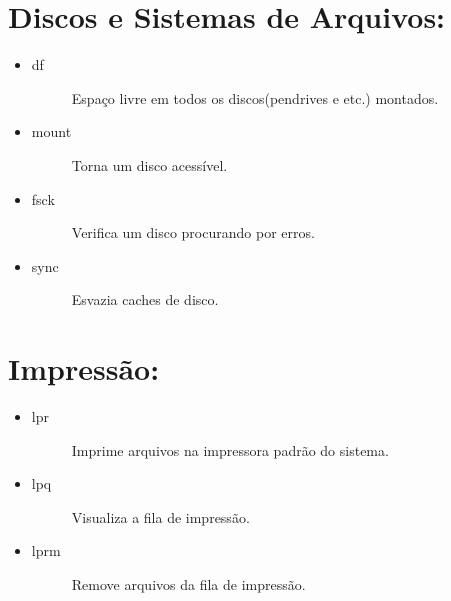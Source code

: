 \documentclass[a4paper,10pt,brazil]{sphinxmanual}
\begin{document}
\section{Discos e Sistemas de Arquivos:}
\label{unix:discos-e-sistemas-de-arquivos}\begin{itemize}
\item {} \begin{description}
\item[{df}] \leavevmode
Espaço livre em todos os discos(pendrives e etc.) montados.

\end{description}

\item {} \begin{description}
\item[{mount}] \leavevmode
Torna um disco acessível.

\end{description}

\item {} \begin{description}
\item[{fsck}] \leavevmode
Verifica um disco procurando por erros.

\end{description}

\item {} \begin{description}
\item[{sync}] \leavevmode
Esvazia caches de disco.

\end{description}

\end{itemize}


\section{Impressão:}
\label{unix:impressao}\begin{itemize}
\item {} \begin{description}
\item[{lpr}] \leavevmode
Imprime arquivos na impressora padrão do sistema.

\end{description}

\item {} \begin{description}
\item[{lpq}] \leavevmode
Visualiza a fila de impressão.

\end{description}

\item {} \begin{description}
\item[{lprm}] \leavevmode
Remove arquivos da fila de impressão.

\end{description}

\end{itemize}
\end{document}
